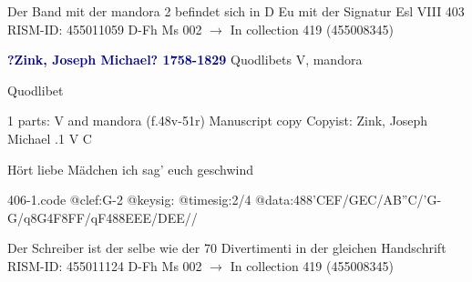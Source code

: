 \documentclass[twocolumn]{book}
\begin{document}
\newline Der Band mit der mandora 2 befindet sich in D Eu mit der Signatur Esl VIII 403
\newline RISM-ID: 455011059
\newline D-Fh  Ms 002
\newline $\rightarrow$ In collection 419 (455008345)
      
\newline \par \vspace{7pt} \textcolor{darkblue}{\textbf{?Zink, Joseph Michael?  1758-1829}}
\newline Quodlibets
\newline V, mandora
\newline \begin{itshape}[heading, f.48v:] Quodlibet\end{itshape} 
\newline \textcolor{darkblue}{}  1 parts: V and mandora  (f.48v-51r)
\newline Manuscript copy
\newline Copyist: Zink, Joseph Michael
.1  V  C
\newline \begin{footnotesize} Hört liebe Mädchen ich sag' euch geschwind \end{footnotesize}  
\begin{filecontents*}{406-1.code}
@clef:G-2
@keysig:
@timesig:2/4
@data:488'CEF/GEC/AB''C/'G-G/q8G4F8FF/qF488EEE/DEE//
\end{filecontents*}
\newline
%

\newline Der Schreiber ist der selbe wie der 70 Divertimenti in der gleichen Handschrift
\newline RISM-ID: 455011124
\newline D-Fh  Ms 002
\newline $\rightarrow$ In collection 419 (455008345)
      
\end{document}

